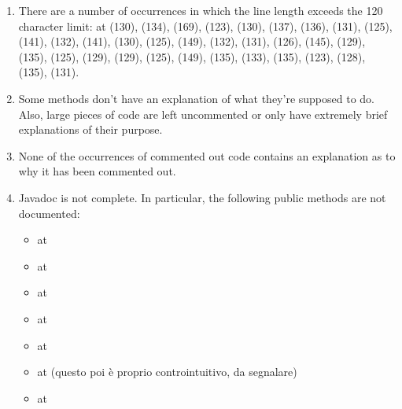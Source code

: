 \begin{enumerate}
	\item {} There are a number of occurrences in which the line length exceeds the 120 character limit: at (130), (134), (169), (123), (130), (137), (136), (131), (125), (141), (132), (141), (130), (125), (149), (132), (131), (126), (145), (129), (135), (125), (129), (129), (125), (149), (135), (133), (135), (123), (128), (135), (131).
	\item {} Some methods don't have an explanation of what they're supposed to do. Also, large pieces of code are left uncommented or only have extremely brief explanations of their purpose. 
	\item {} None of the occurrences of commented out code contains an explanation as to why it has been commented out. 
	\item {} Javadoc is not complete. In particular, the following public methods are not documented: 
		\begin{itemize}
		\item {} at 
		\item {} at 
		\item {} at 
		\item {} at  
		\item {} at 
		\item {} at  (questo poi è proprio controintuitivo, da segnalare)
		\item {} at 

\end{itemize}
\end{enumerate}

